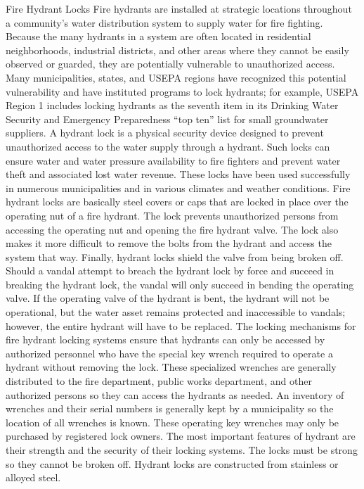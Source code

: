 \documentclass{article}
\begin{document}
Fire Hydrant Locks Fire hydrants are installed at strategic locations
throughout a community's water distribution system to supply water for
fire fighting. Because the many hydrants in a system are often located
in residential neighborhoods, industrial districts, and other areas
where they cannot be easily observed or guarded, they are potentially
vulnerable to unauthorized access. Many municipalities, states, and
USEPA regions have recognized this potential vulnerability and have
instituted programs to lock hydrants; for example, USEPA Region 1
includes locking hydrants as the seventh item in its Drinking Water
Security and Emergency Preparedness ``top ten'' list for small
groundwater suppliers. A hydrant lock is a physical security device
designed to prevent unauthorized access to the water supply through a
hydrant. Such locks can ensure water and water pressure availability to
fire fighters and prevent water theft and associated lost water revenue.
These locks have been used successfully in numerous municipalities and
in various climates and weather conditions. Fire hydrant locks are
basically steel covers or caps that are locked in place over the
operating nut of a fire hydrant. The lock prevents unauthorized persons
from accessing the operating nut and opening the fire hydrant valve. The
lock also makes it more difficult to remove the bolts from the hydrant
and access the system that way. Finally, hydrant locks shield the valve
from being broken off. Should a vandal attempt to breach the hydrant
lock by force and succeed in breaking the hydrant lock, the vandal will
only succeed in bending the operating valve. If the operating valve of
the hydrant is bent, the hydrant will not be operational, but the water
asset remains protected and inaccessible to vandals; however, the entire
hydrant will have to be replaced. The locking mechanisms for fire
hydrant locking systems ensure that hydrants can only be accessed by
authorized personnel who have the special key wrench required to operate
a hydrant without removing the lock. These specialized wrenches are
generally distributed to the fire department, public works department,
and other authorized persons so they can access the hydrants as needed.
An inventory of wrenches and their serial numbers is generally kept by a
municipality so the location of all wrenches is known. These operating
key wrenches may only be purchased by registered lock owners. The most
important features of hydrant are their strength and the security of
their locking systems. The locks must be strong so they cannot be broken
off. Hydrant locks are constructed from stainless or alloyed steel.
\end{document}
